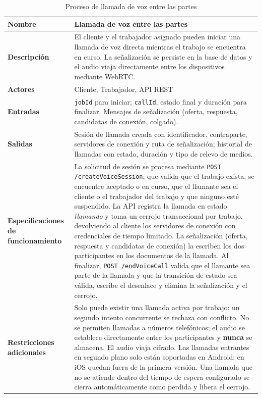 \documentclass[doc,12pt,a4paper]{apa7}
\begin{document}
\begin{longtable}{|P{3.3cm}|L{11.2cm}|}
\caption{Proceso de llamada de voz entre las partes}\\
\hline
\textbf{Nombre} & Llamada de voz entre las partes \\ \hline
\textbf{Descripción} & El cliente y el trabajador asignado pueden iniciar una llamada de voz directa mientras el trabajo se encuentra en curso. La señalización se persiste en la base de datos y el audio viaja directamente entre los dispositivos mediante WebRTC. \\ \hline
\textbf{Actores} & Cliente, Trabajador, API REST \\ \hline
\textbf{Entradas} & \texttt{jobId} para iniciar; \texttt{callId}, estado final y duración para finalizar. Mensajes de señalización (oferta, respuesta, candidatas de conexión, colgado). \\ \hline
\textbf{Salidas} & Sesión de llamada creada con identificador, contraparte, servidores de conexión y ruta de señalización; historial de llamadas con estado, duración y tipo de relevo de medios. \\ \hline
\textbf{Especificaciones de funcionamiento} & La solicitud de sesión se procesa mediante \texttt{POST /createVoiceSession}, que valida que el trabajo exista, se encuentre aceptado o en curso, que el llamante sea el cliente o el trabajador del trabajo y que ninguno esté suspendido. La API registra la llamada en estado \textit{llamando} y toma un cerrojo transaccional por trabajo, devolviendo al cliente los servidores de conexión con credenciales de tiempo limitado. La señalización (oferta, respuesta y candidatas de conexión) la escriben los dos participantes en los documentos de la llamada. Al finalizar, \texttt{POST /endVoiceCall} valida que el llamante sea parte de la llamada y que la transición de estado sea válida, escribe el desenlace y elimina la señalización y el cerrojo. \\ \hline
\textbf{Restricciones adicionales} & Solo puede existir una llamada activa por trabajo: un segundo intento concurrente se rechaza con conflicto. No se permiten llamadas a números telefónicos; el audio se establece directamente entre los participantes y \textbf{nunca} se almacena. El audio viaja cifrado. Las llamadas entrantes en segundo plano solo están soportadas en Android; en iOS quedan fuera de la primera versión. Una llamada que no se atiende dentro del tiempo de espera configurado se cierra automáticamente como perdida y libera el cerrojo. \\ \hline
\end{longtable}
\end{document}
